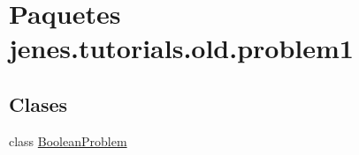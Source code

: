 \hypertarget{namespacejenes_1_1tutorials_1_1old_1_1problem1}{\section{Paquetes jenes.\-tutorials.\-old.\-problem1}
\label{namespacejenes_1_1tutorials_1_1old_1_1problem1}
}
\subsection*{Clases}
\begin{DoxyCompactItemize}
\item 
class \hyperlink{classjenes_1_1tutorials_1_1old_1_1problem1_1_1_boolean_problem}{Boolean\-Problem}
\end{DoxyCompactItemize}
